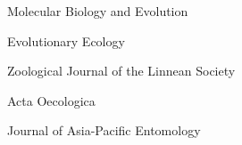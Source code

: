 {\color{awesome}\faClipboardCheck}


\begin{cvskills}

  \cvskill
    {} %
    {Molecular Biology and Evolution} %

  \cvskill
    {} %
    {Evolutionary Ecology} %

  \cvskill
    {} %
    {Zoological Journal of the Linnean Society} %

  \cvskill
    {} %
    {Acta Oecologica} %

  \cvskill
    {} %
    {Journal of Asia-Pacific Entomology} %

\end{cvskills}
